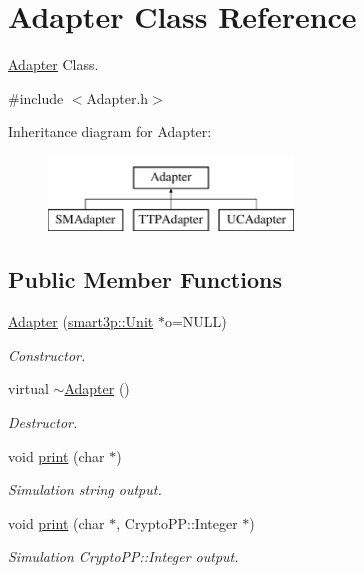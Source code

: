 \hypertarget{classAdapter}{}\section{Adapter Class Reference}
\label{classAdapter}


\hyperlink{classAdapter}{Adapter} Class.  




{\ttfamily \#include $<$Adapter.\+h$>$}

Inheritance diagram for Adapter\+:\begin{figure}[H]
\begin{center}
\leavevmode
\includegraphics[height=2.000000cm]{classAdapter}
\end{center}
\end{figure}
\subsection*{Public Member Functions}
\begin{DoxyCompactItemize}
\item 
\hyperlink{classAdapter_a8c1799a1bd84d52fc7cbd8ebd07734eb}{Adapter} (\hyperlink{classsmart3p_1_1Unit}{smart3p\+::\+Unit} $\ast$o=N\+U\+LL)
\begin{DoxyCompactList}\small\item\em Constructor. \end{DoxyCompactList}\item 
virtual \hyperlink{classAdapter_a08a07acff57eb40aba27455de23ed13c}{$\sim$\+Adapter} ()
\begin{DoxyCompactList}\small\item\em Destructor. \end{DoxyCompactList}\item 
void \hyperlink{classAdapter_af928c4508bc6a76e8f9b918d38ffd221}{print} (char $\ast$)
\begin{DoxyCompactList}\small\item\em Simulation string output. \end{DoxyCompactList}\item 
void \hyperlink{classAdapter_a411c5677216438c68fc06f29909bf124}{print} (char $\ast$, Crypto\+P\+P\+::\+Integer $\ast$)
\begin{DoxyCompactList}\small\item\em Simulation Crypto\+P\+P\+::\+Integer output. \end{DoxyCompactList}\end{DoxyCompactItemize}
